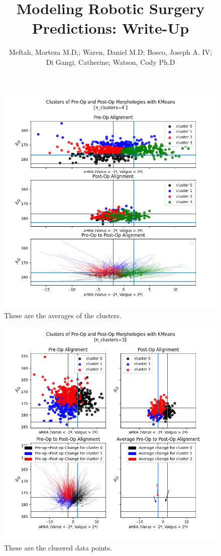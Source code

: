 \documentclass{article}
\author{Meftah, Morteza M.D,; Waren, Daniel M.D; Bosco, Joseph A. IV;\\
Di Gangi, Catherine; Watson, Cody Ph.D}
\title{Modeling Robotic Surgery Predictions: Write-Up}
\begin{document}
\maketitle

\begin{figure}[h]
\includegraphics[width=.9\textwidth]{data_vis.png}
\caption{These are the averages of the clusters. }
\end{figure}



\newpage

\begin{figure}[h]
\includegraphics[width=\textwidth]{clusters.png}
\caption{These are the clusered data points.}
\end{figure}
\end{document}
